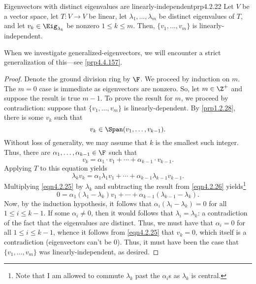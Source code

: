 \begin{prp}{Eigenvectors with distinct eigenvalues are linearly-independent}{prp4.2.22}
	Let $V$ be a vector space, let $T\colon V\rightarrow V$ be linear, let $\lambda _1,\ldots ,\lambda _m$ be distinct eigenvalues of $T$, and let $v_k\in \Eig _{\lambda _k}$ be nonzero $1\leq k\leq m$.  Then, $\{ v_1,\ldots ,v_m\}$ is linearly-independent.
	\begin{rmk}
		When we investigate generalized-eigenvectors, we will encounter a strict generalization of this---see \cref{prp4.4.157}.
	\end{rmk}
	\begin{proof}
		Denote the ground division ring by $\F$.  We proceed by induction on $m$.  The $m=0$ case is immediate as eigenvectors are nonzero.  So, let $m\in \Z ^+$ and suppose the result is true $m-1$.  To prove the result for $m$, we proceed by contradiction:  suppose that $\{ v_1,\ldots ,v_m\}$ is linearly-dependent.  By \cref{prp1.2.28}, there is some $v_k$ such that
		\begin{equation}
			v_k\in \Span (v_1,\ldots ,v_{k-1}).
		\end{equation}
		Without loss of generality, we may assume that $k$ is the smallest such integer.  Thus, there are $\alpha _1,\ldots ,\alpha _{k-1}\in \F$ such that
		\begin{equation}\label{eqn4.2.25}
			v_k=\alpha _1\cdot v_1+\cdots +\alpha _{k-1}\cdot v_{k-1}.
		\end{equation}
		Applying $T$ to this equation yields
		\begin{equation}\label{eqn4.2.26}
			\lambda _kv_k=\alpha _1\lambda _1v_1+\cdots +\alpha _{k-1}\lambda _{k-1}v_{k-1}.
		\end{equation}
		Multiplying \eqref{eqn4.2.25} by $\lambda _k$ and subtracting the result from \eqref{eqn4.2.26} yields\footnote{Note that I am allowed to commute $\lambda _k$ past the $\alpha _i$s as $\lambda _k$ is central.}
		\begin{equation}
			0=\alpha _1(\lambda _1-\lambda _k)v_1+\cdots +\alpha _{k-1}(\lambda _{k-1}-\lambda _k).
		\end{equation}
		Now, by the induction hypothesis, it follows that $\alpha _i(\lambda _i-\lambda _k)=0$ for all $1\leq i\leq k-1$.  If some $\alpha _i\neq 0$, then it would follows that $\lambda _i=\lambda _k$:  a contradiction of the fact that the eigenvalues are distinct.  Thus, we must have that $\alpha _i=0$ for all $1\leq i\leq k-1$, whence it follows from \eqref{eqn4.2.25} that $v_k=0$, which itself is a contradiction (eigenvectors can't be $0$).  Thus, it must have been the case that $\{ v_1,\ldots ,v_m\}$ was linearly-independent, as desired.
	\end{proof}
\end{prp}
